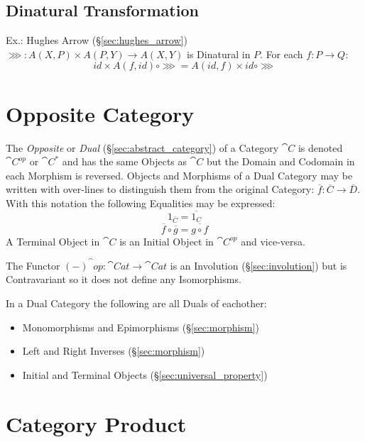 \subsection{Dinatural Transformation}
\label{sec:dinatural_transformation}

Ex.: Hughes Arrow (\S\ref{sec:hughes_arrow}) $\ggg : A (X,P) \times A
(P,Y) \rightarrow A (X,Y)$ is Dinatural in $P$. For each $f : P
\rightarrow Q$:
\[
  id \times A(f,id) \circ \ggg = A(id,f) \times id \circ \ggg
\]



\section{Opposite Category}\label{sec:opposite_category}

The \emph{Opposite} or \emph{Dual} (\S\ref{sec:abstract_category})
of a Category $\cat{C}$ is denoted $\cat{C^{op}}$ or
$\cat{C^*}$ and has the same Objects as $\cat{C}$ but the Domain
and Codomain in each Morphism is reversed. Objects and Morphisms of a
Dual Category may be written with over-lines to distinguish them from
the original Category: $\overline{f}: \overline{C} \rightarrow
\overline{D}$. With this notation the following Equalities may be
expressed:
\[
  1_{\overline{C}} = \overline{1_C}
\]\[
  \overline{f} \circ \overline{g} = \overline{g \circ f}
\]
A Terminal Object in $\cat{C}$ is an Initial Object in
$\cat{C^{op}}$ and vice-versa.

The Functor $(-)^\cat{op} : \cat{Cat} \rightarrow \cat{Cat}$
is an Involution (\S\ref{sec:involution}) but is Contravariant so it
does not define any Isomorphisms.

In a Dual Category the following are all Duals of eachother:
\begin{itemize}
  \item Monomorphisms and Epimorphisms (\S\ref{sec:morphism})
  \item Left and Right Inverses (\S\ref{sec:morphism})
  \item Initial and Terminal Objects (\S\ref{sec:universal_property})
\end{itemize}



\section{Category Product}\label{sec:category_product}

